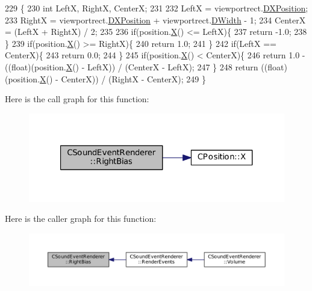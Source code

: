 \begin{DoxyCode}
229                                                                                              \{
230     \textcolor{keywordtype}{int} LeftX, RightX, CenterX;
231     
232     LeftX = viewportrect.\hyperlink{structSRectangle_abcbddb03b3ee416cc33109833b5f075c}{DXPosition};
233     RightX = viewportrect.\hyperlink{structSRectangle_abcbddb03b3ee416cc33109833b5f075c}{DXPosition} + viewportrect.\hyperlink{structSRectangle_a4150898b3f7d90f6e4b0d44bf1ae3bd2}{DWidth} - 1;
234     CenterX = (LeftX + RightX) / 2;
235     
236     \textcolor{keywordflow}{if}(position.\hyperlink{classCPosition_a9a6b94d3b91df1492d166d9964c865fc}{X}() <= LeftX)\{
237         \textcolor{keywordflow}{return} -1.0;   
238     \}
239     \textcolor{keywordflow}{if}(position.\hyperlink{classCPosition_a9a6b94d3b91df1492d166d9964c865fc}{X}() >= RightX)\{
240         \textcolor{keywordflow}{return} 1.0;
241     \}
242     \textcolor{keywordflow}{if}(LeftX == CenterX)\{
243         \textcolor{keywordflow}{return} 0.0;   
244     \}
245     \textcolor{keywordflow}{if}(position.\hyperlink{classCPosition_a9a6b94d3b91df1492d166d9964c865fc}{X}() < CenterX)\{
246         \textcolor{keywordflow}{return} 1.0 - ((float)(position.\hyperlink{classCPosition_a9a6b94d3b91df1492d166d9964c865fc}{X}() - LeftX)) / (CenterX - LeftX);
247     \}
248     \textcolor{keywordflow}{return} ((\textcolor{keywordtype}{float})(position.\hyperlink{classCPosition_a9a6b94d3b91df1492d166d9964c865fc}{X}() - CenterX)) / (RightX - CenterX);
249 \}
\end{DoxyCode}
Here is the call graph for this function\+:
\nopagebreak
\begin{figure}[H]
\begin{center}
\leavevmode
\includegraphics[width=321pt]{classCSoundEventRenderer_a4be5ff09785c55c3b5b6966fb41eb47f_cgraph}
\end{center}
\end{figure}
Here is the caller graph for this function\+:
\nopagebreak
\begin{figure}[H]
\begin{center}
\leavevmode
\includegraphics[width=350pt]{classCSoundEventRenderer_a4be5ff09785c55c3b5b6966fb41eb47f_icgraph}
\end{center}
\end{figure}
\hypertarget{classCSoundEventRenderer_a96b3c1c479057daa5f62b73bab6409a3}{}\label{classCSoundEventRenderer_a96b3c1c479057daa5f62b73bab6409a3} 
